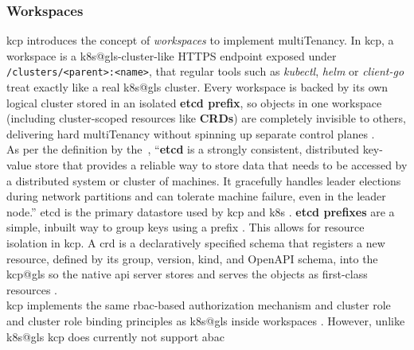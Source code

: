 \documentclass[11pt, a4paper, oneside, listof=totoc]{scrartcl}
\begin{document}
            \subsubsection{Workspaces}\label{subsubsec:workspaces}
                \gls{kcp} introduces the concept of \textit{workspaces} to implement
                \gls{multiTenancy}.
                In \gls{kcp}, a workspace is a \gls{k8s@gls}-cluster-like HTTPS endpoint exposed
                under \texttt{/clusters/<parent>:<name>}, that regular tools such as
                \textit{kubectl}, \textit{\gls{helm}} or \textit{client-go} treat exactly like a real
                \gls{k8s@gls} cluster.
                Every workspace is backed by its own logical cluster stored in an isolated
                \textbf{\gls{etcd} prefix}, so objects in one workspace (including cluster-scoped
                resources like \textbf{CRDs}) are completely invisible to others, delivering hard
                \gls{multiTenancy} without spinning up separate control planes
                \parencite{kcpWorkspaces}.
                \\
                As per the definition by the~\cite{etcd}, \enquote{\textbf{\gls{etcd}} is a strongly
                consistent, distributed key-value store that provides a reliable way to store data
                that needs to be accessed by a distributed system or cluster of machines.
                It gracefully handles leader elections during network partitions and can tolerate
                machine failure, even in the leader node.}
                \gls{etcd} is the primary datastore used by \gls{kcp} and \gls{k8s}
                \parencites{kcpDevStorageToRest}[p.~214]{sun2021}.
                \textbf{\gls{etcd} prefixes} are a simple, inbuilt way to group keys using a prefix
                \parencite{etcdPrefix}.
                This allows for resource isolation in \gls{kcp}.\@
                A \gls{crd} is a declaratively specified schema that registers a new  resource,
                defined by its group, version, kind, and OpenAPI schema, into the \gls{kcp@gls} so
                the native \gls{api} server stores and serves the objects as first-class
                resources \parencite{kubernetesCRD}.
                \\
                \gls{kcp} implements the same \gls{rbac}-based authorization mechanism and cluster
                role and cluster role binding principles as \gls{k8s@gls} inside workspaces 
                \parencite{kcpAuthorization}.
                However, unlike \gls{k8s@gls} \gls{kcp} does currently not support \gls{abac}
\end{document}
